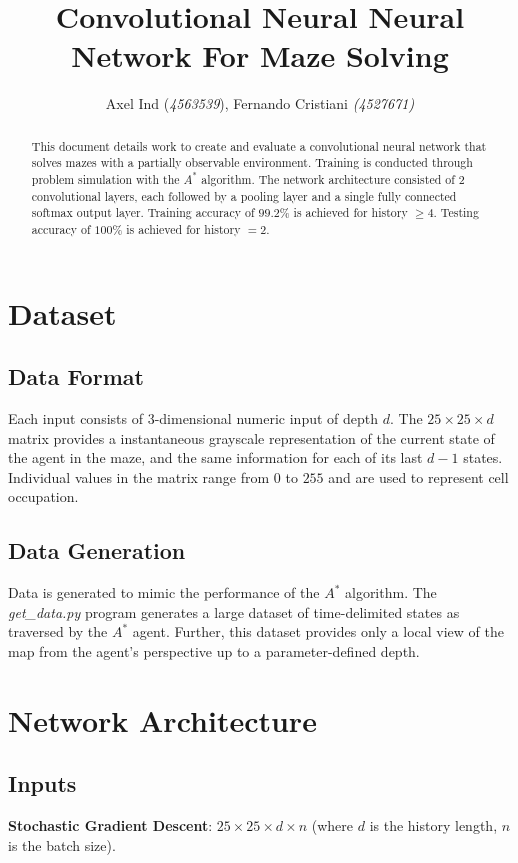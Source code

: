 \documentclass{article}
\begin{document}
\title{Convolutional Neural Neural Network For Maze Solving}
\author{Axel Ind (\textit{4563539}), Fernando Cristiani \textit{(4527671)}}

\maketitle

\begin{abstract}
This document details work to create and evaluate a convolutional neural network that solves mazes with a partially observable environment. Training is conducted through problem simulation with the $A^*$ algorithm. The network architecture consisted of 2 convolutional layers, each followed by a pooling layer and a single fully connected softmax output layer. Training accuracy of $99.2\%$ is achieved for history $\geq 4$. Testing accuracy of $100\%$ is achieved for history $=2$.
\end{abstract}

\section{Dataset}
\subsection{Data Format}
Each input consists of 3-dimensional numeric input of depth $d$. The $25\times 25\times d$ matrix provides a instantaneous grayscale representation of the current state of the agent in the maze, and the same information for each of its last $d-1$ states. Individual values in the matrix range from $0$ to $255$ and are used to represent cell occupation.
\subsection{Data Generation}
Data is generated to mimic the performance of the $A^*$ algorithm. The \textit{get\_data.py} program generates a large dataset of time-delimited states as traversed by the $A^*$ agent. Further, this dataset provides only a local view of the map from the agent's perspective up to a parameter-defined depth.

\section{Network Architecture}
\subsection{Inputs}
\textbf{Stochastic Gradient Descent}: $25 \times 25 \times d \times n$ (where $d$ is the history length, $n$ is the batch size).
\end{document}
